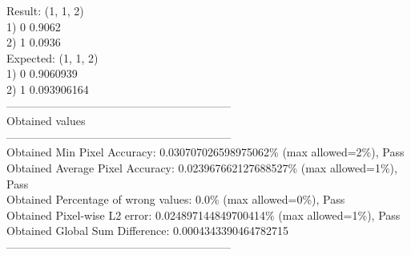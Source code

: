 Result:  (1, 1, 2)\\
1) 0 0.9062\\
2) 1 0.0936\\
Expected:  (1, 1, 2)\\
1) 0 0.9060939\\
2) 1 0.093906164\\
------------------------------------------------------------\\
 Obtained values \\
------------------------------------------------------------\\
 Obtained Min Pixel Accuracy: 0.030707026598975062\% (max allowed=2\%), Pass\\
 Obtained Average Pixel Accuracy: 0.023967662127688527\% (max allowed=1\%), Pass\\
 Obtained Percentage of wrong values: 0.0\% (max allowed=0\%), Pass\\
 Obtained Pixel-wise L2 error: 0.024897144849700414\% (max allowed=1\%), Pass\\
 Obtained Global Sum Difference: 0.0004343390464782715\\
------------------------------------------------------------